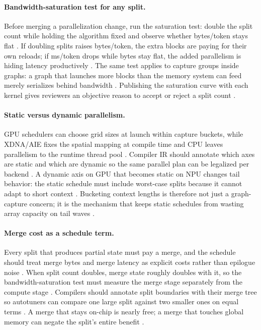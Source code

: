 \paragraph{Bandwidth-saturation test for any split.}
Before merging a parallelization change, run the saturation test: double the split count while holding the algorithm fixed and observe whether bytes/token stays flat \citep{memoryfloor2026,semianalysis2024tma,taxbreak2026}. If doubling splits raises bytes/token, the extra blocks are paying for their own reloads; if ms/token drops while bytes stay flat, the added parallelism is hiding latency productively \citep{patel2025llminference,memoryfloor2026}. The same test applies to capture groups inside graphs: a graph that launches more blocks than the memory system can feed merely serializes behind bandwidth \citep{nvidia2024cudagraphs,taxbreak2026}. Publishing the saturation curve with each kernel gives reviewers an objective reason to accept or reject a split count \citep{yirage2026,chen2020compilerbasedhardw}.

\paragraph{Static versus dynamic parallelism.}
GPU schedulers can choose grid sizes at launch within capture buckets, while XDNA/AIE fixes the spatial mapping at compile time and CPU leaves parallelism to the runtime thread pool \citep{nvidia2024cudagraphs,amd2024aie,dlbook}. Compiler IR should annotate which axes are static and which are dynamic so the same parallel plan can be legalized per backend \citep{yirage2026,chen2020compilerbasedhardw}. A dynamic axis on GPU that becomes static on NPU changes tail behavior: the static schedule must include worst-case splits because it cannot adapt to short context \citep{amd2024xdna,amd2024aie}. Bucketing context lengths is therefore not just a graph-capture concern; it is the mechanism that keeps static schedules from wasting array capacity on tail waves \citep{kwon2023vllm,taxbreak2026}.

\paragraph{Merge cost as a schedule term.}
Every split that produces partial state must pay a merge, and the schedule should treat merge bytes and merge latency as explicit costs rather than epilogue noise \citep{dao2023flashdecoding,taxbreak2026,patel2025llminference}. When split count doubles, merge state roughly doubles with it, so the bandwidth-saturation test must measure the merge stage separately from the compute stage \citep{memoryfloor2026,dao2022flashattention}. Compilers should annotate split boundaries with their merge tree so autotuners can compare one large split against two smaller ones on equal terms \citep{yirage2026,chen2020compilerbasedhardw}. A merge that stays on-chip is nearly free; a merge that touches global memory can negate the split's entire benefit \citep{semianalysis2024tma,memoryfloor2026}.

